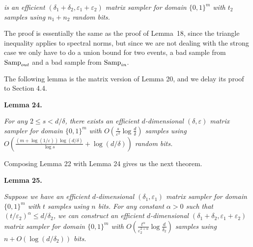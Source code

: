\documentclass[10pt,a4paper]{article}
\begin{document}
\emph{is an efficient $(\delta_{1}+\delta_{2},\varepsilon_{1}+\varepsilon_{2})$ matrix sampler for domain $\{0,1\}^{m}$ with $t_{2}$ samples using $n_{1}+n_{2}$ random bits.}\par






The proof is essentially the same as the proof of Lemma 18, since the triangle inequality applies to spectral norms, but since we are not dealing with the strong case we only have to do a union bound for two events, a bad sample from $\textup{{Samp}}_{out}$ and a bad sample from $\textup{{Samp}}_{in}$.\par




The following lemma is the matrix version of Lemma 20, and we delay its proof to Section 4.4.\par





\par\medskip\noindent\textbf{
\textbf{Lemma 24}\textbf{.}
}\par



\emph{For any $2\leq s<d/\delta$, there exists an efficient $d$-dimensional $(\delta,\varepsilon)$ matrix sampler for domain $\{0,1\}^{m}$ with $O(\frac{s}{\varepsilon^{2}}\log\frac{d}{\delta})$ samples using
$O(\frac{(m+\log(1/\varepsilon))\log(d/\delta)}{\log s}+\log(d/\delta))$
random bits.}\par






Composing Lemma 22 with Lemma 24 gives us the next theorem.\par





\par\medskip\noindent\textbf{
\textbf{Lemma 25}\textbf{.}
}\par



\emph{Suppose we have an efficient $d$-dimensional $(\delta_{1},\varepsilon_{1})$ matrix sampler for domain $\{0,1\}^{m}$ with $t$ samples using $n$ bits. For any constant $\alpha>0$ such that $(t/\varepsilon_{2})^{\alpha}\leq d/\delta_{2}$, we can construct an efficient $d$-dimensional $(\delta_{1}+\delta_{2},\varepsilon_{1}+\varepsilon_{2})$ matrix sampler for domain $\{0,1\}^{m}$ with $O(\frac{t^{\alpha}}{\varepsilon_{2}^{2+\alpha}}\log\frac{d}{\delta_{2}})$ samples using $n+O(\log(d/\delta_{2}))$ bits.}\par
\end{document}

